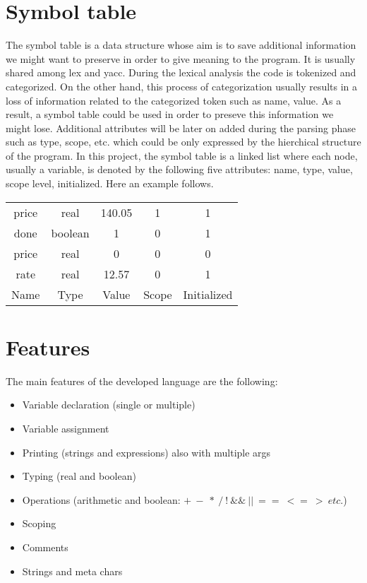 \documentclass[12pt]{article}
\begin{document}
\section{Symbol table}
The symbol table is a data structure whose aim is to save additional information we might want to preserve in order to give meaning to the program. It is usually shared among lex and yacc. During the lexical analysis the code is tokenized and categorized. On the other hand, this process of categorization usually results in a loss of information related to the categorized token such as name, value. As a result, a symbol table could be used in order to preseve this information we might lose. Additional attributes will be later on added during the parsing phase such as type, scope, etc. which could be only expressed by the hierchical structure of the program. In this project, the symbol table is a linked list where each node, usually a variable, is denoted by the following five attributes: name, type, value, scope level, initialized. Here an example follows.
\vspace{0.3cm}
\begin{table}[h!]
\centering
\begin{tabular}{c|c|c|c|c}
price & real & 140.05 & 1 & 1\\
done & boolean & 1 & 0 & 1\\
price & real & 0 & 0 & 0\\
rate & real & 12.57 & 0 & 1\\
\hline
Name & Type & Value & Scope & Initialized
\end{tabular}
\end{table}
\vspace{1.7cm}





\section{Features}
The main features of the developed language are the following:
\begin{itemize}
\item Variable declaration (single or multiple)
\item Variable assignment
\item Printing (strings and expressions) also with multiple args
\item Typing (real and boolean)
\item Operations (arithmetic and boolean: $+\ -\ *\ /\ !\ \&\&\ ||\ ==\ <=\ >\ etc.$)
\item Scoping
\item Comments
\item Strings and meta chars
\end{itemize}
\end{document}

